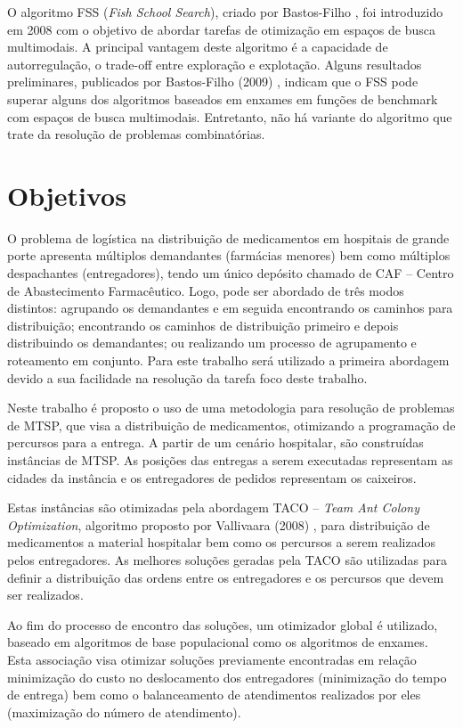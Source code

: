 O algoritmo FSS (\textit{Fish School Search}), criado por Bastos-Filho \cite{bastos2008novel}, foi introduzido em 2008 com o objetivo de abordar tarefas de otimização em espaços de busca multimodais. A principal vantagem deste algoritmo é a capacidade de autorregulação, o trade-off entre exploração e explotação. Alguns resultados preliminares, publicados por Bastos-Filho (2009) \cite{bastos2009fish}, indicam que o FSS pode superar alguns dos algoritmos baseados em enxames em funções de benchmark com espaços de busca multimodais. Entretanto, não há variante do algoritmo que trate da resolução de problemas combinatórias.

\section{Objetivos}
\label{sec-objetivos}

O problema de logística na distribuição de medicamentos em hospitais de grande porte apresenta múltiplos demandantes (farmácias menores) bem como múltiplos despachantes (entregadores), tendo um único depósito chamado de CAF – Centro de Abastecimento Farmacêutico. Logo, pode ser abordado de três modos distintos: agrupando os demandantes e em seguida encontrando os caminhos para distribuição; encontrando os caminhos de distribuição primeiro e depois distribuindo os demandantes; ou realizando um processo de agrupamento e roteamento em conjunto. Para este trabalho será utilizado a primeira abordagem devido a sua facilidade na resolução da tarefa foco deste trabalho.

Neste trabalho é proposto o uso de uma metodologia para resolução de problemas de MTSP, que visa a distribuição de medicamentos, otimizando a programação de percursos para a entrega. A partir de um cenário hospitalar, são construídas instâncias de MTSP. As posições das entregas a serem executadas representam as cidades da instância e os entregadores de pedidos representam os caixeiros.

Estas instâncias são otimizadas pela abordagem TACO – \textit{Team Ant Colony Optimization}, algoritmo proposto por Vallivaara (2008) \cite{vallivaara2008team}, para distribuição de medicamentos a material hospitalar bem como os percursos a serem realizados pelos entregadores. As melhores soluções geradas pela TACO são utilizadas para definir a distribuição das ordens entre os entregadores e os percursos que devem ser realizados.

Ao fim do processo de encontro das soluções, um otimizador global é utilizado, baseado em algoritmos de base populacional como os algoritmos de enxames. Esta associação visa otimizar soluções previamente encontradas em relação minimização do custo no deslocamento dos entregadores (minimização do tempo de entrega) bem como o balanceamento de atendimentos realizados por eles (maximização do número de atendimento).

